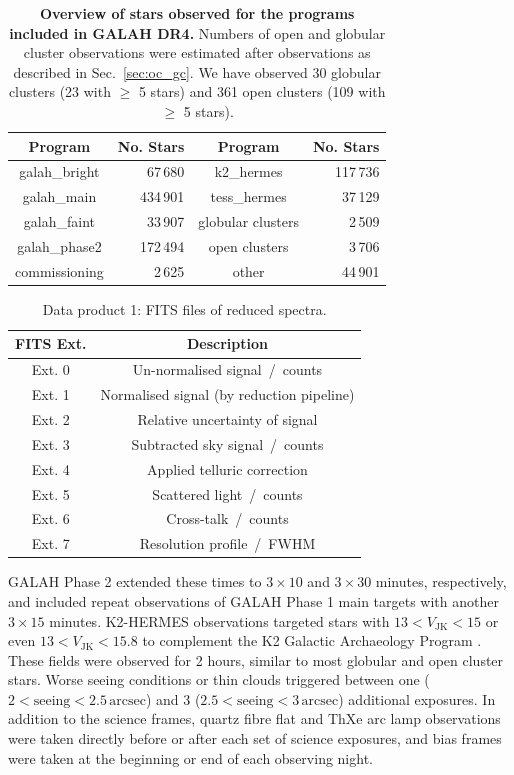 \documentclass[
  journal=pasa,
  manuscript=research-paper, %
  year=2024,
  volume=37
]{cup-journal}
\begin{document}
\begin{table}
\centering
 \caption{\textbf{Overview of stars observed for the programs included in GALAH DR4.} Numbers of open and globular cluster observations were estimated after observations as described in Sec.~\ref{sec:oc_gc}. We have observed 30 globular clusters (23 with $\geq$ 5 stars) and 361 open clusters (109 with $\geq$ 5 stars).}
\label{tab:field_ids}
\begin{tabular}{crcr}
\hline \hline
Program & No. Stars & Program & No. Stars \\
\hline
galah\_bright & 67\,680 & 
k2\_hermes & 117\,736\\
galah\_main & 434\,901 & 
tess\_hermes & 37\,129\\
galah\_faint & 33\,907 & 
globular clusters & 2\,509\\ %
galah\_phase2 & 172\,494 & 
open clusters & 3\,706\\ %
commissioning & 2\,625 & 
other & 44\,901\\
  \hline
 \end{tabular}
\end{table}

\begin{table}
    \centering
    \caption{Data product 1: FITS files of reduced spectra.}
    \label{tab:reduction_fits}
    \begin{tabular}{cc}
    \hline \hline
    FITS Ext. & Description \\
    \hline
    Ext. 0 & Un-normalised signal~/~counts \\
    Ext. 1 & Normalised signal (by reduction pipeline) \\
    Ext. 2 & Relative uncertainty of signal \\
    Ext. 3 & Subtracted sky signal~/~counts \\
    Ext. 4 & Applied telluric correction \\
    Ext. 5 & Scattered light~/~counts \\
    Ext. 6 & Cross-talk~/~counts \\
    Ext. 7 & Resolution profile~/~FWHM \\
    \hline
    \end{tabular}
\end{table}

GALAH Phase 2 extended these times to $3 \times 10$ and $3 \times 30$ minutes, respectively, and included repeat observations of GALAH Phase 1 main targets with another $3 \times 15$ minutes. K2-HERMES observations targeted stars with $13 < V_\mathrm{JK} < 15$ or even $13 < V_\mathrm{JK} < 15.8$ to complement the K2 Galactic Archaeology Program \citep{Stello2015}. These fields were observed for 2 hours, similar to most globular and open cluster stars. Worse seeing conditions or thin clouds triggered between one ($2 < \mathrm{seeing} < 2.5\,\mathrm{arcsec}$) and 3 ($2.5 < \mathrm{seeing} < 3\,\mathrm{arcsec}$) additional exposures. In addition to the science frames, quartz fibre flat and ThXe arc lamp observations were taken directly before or after each set of science exposures, and bias frames were taken at the beginning or end of each observing night.
\end{document}
